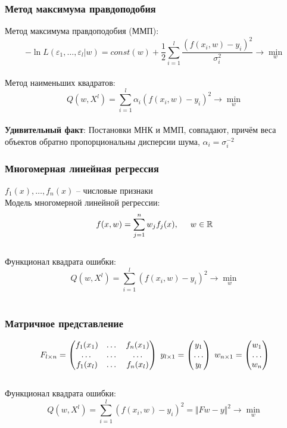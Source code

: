 \documentclass[12pt, aspectratio=169]{beamer}
\begin{document}
\begin{frame}\frametitle{Метод максимума правдоподобия}
Метод максимума правдоподобия (ММП):\\
$$- \ln L(\varepsilon_1, \dots, \varepsilon_l| w) = const(w) + \frac{1}{2} \sum\limits_{i=1}^l \frac{(f(x_i, w) - y_i)^2}{\sigma_i^2}  \rightarrow \min\limits_{w}$$\\
\vspace{2mm}
Метод наименьших квадратов: $$Q(w,X^l) = \sum\limits_{i=1}^l \alpha_i (f (x_i, w) - y_i)^2 \rightarrow \min\limits_{w}$$\\
\vspace{5mm}
\textbf{Удивительный факт}: Постановки МНК и ММП, совпадают, причём веса объектов
обратно пропорциональны дисперсии шума, $\alpha_i = \sigma_i^{-2}$
\end{frame}

\begin{frame}\frametitle{Многомерная линейная регрессия}
$f_1(x), \dots, f_n(x)$ -- числовые признаки\\
Модель многомерной линейной регрессии:\\
$$f (x, w) = \sum\limits_{j=1}^n w_j f_j(x), \hspace{5mm} w \in \mathbb{R}$$\\
\vspace{5mm}
Функционал квадрата ошибки:\\
$$Q(w,X^l) = \sum\limits_{i=1}^l (f (x_i, w) - y_i)^2  \rightarrow \min\limits_{w}$$\\

\end{frame}

\begin{frame}\frametitle{Матричное представление}
$$F_{l \times n} = \begin{pmatrix}
  f_1(x_1) & \dots & f_n(x_1) \\
  \dots & \dots & \dots\\
  f_1(x_l) & \dots & f_n(x_l)
 \end{pmatrix} \hspace{1mm} y_{l \times 1} = \begin{pmatrix}
  y_1 \\
  \dots\\
  y_l
 \end{pmatrix} \hspace{1mm} w_{n \times 1} = \begin{pmatrix}
  w_1 \\
  \dots\\
  w_n
 \end{pmatrix}$$ \\
\vspace{5mm}
Функционал квадрата ошибки:\\
$$Q(w,X^l) = \sum\limits_{i=1}^l (f (x_i, w) - y_i)^2  = \Vert Fw - y \Vert^2 \rightarrow \min\limits_{w}$$\\

\end{frame}
\end{document}
